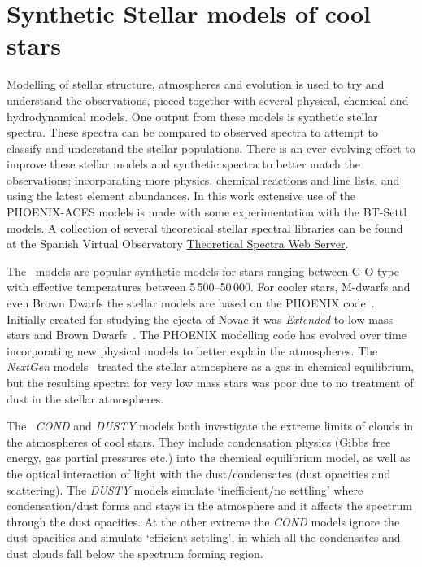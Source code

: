 

\section{Synthetic Stellar models of cool stars}
Modelling of stellar structure, atmospheres and evolution is used to try and understand the observations, pieced together with several physical, chemical and hydrodynamical models.
One output from these models is synthetic stellar spectra.
These spectra can be compared to observed spectra to attempt to classify and understand the stellar populations.
There is an ever evolving effort to improve these stellar models and synthetic spectra to better match the observations; incorporating more physics, chemical reactions and line lists, and using the latest element abundances.
In this work extensive use of the {PHOENIX-ACES} models is made with some experimentation with the {BT-Settl} models.
A collection of several theoretical stellar spectral libraries can be found at the Spanish Virtual Observatory \href{http://svo2.cab.inta-csic.es/theory/newov/index.php}{Theoretical Spectra Web Server}.

The~\citet{kurucz_model_1979} models are popular synthetic models for stars ranging between G-O type with effective temperatures between 5\,500--50\,000\K{}.
For cooler stars, M-dwarfs and even Brown Dwarfs the stellar models are based on the {PHOENIX} code~\citep[e.g.][]{hauschildt_parallel_1997}.
Initially created for studying the ejecta of Novae it was \emph{Extended} to low mass stars and Brown Dwarfs~\citep{allard_model_1995}.
The {PHOENIX} modelling code has evolved over time incorporating new physical models to better explain the atmospheres.
The \emph{NextGen} models~\citep{hauschildt_nextgen_1999} treated the stellar atmosphere as a gas in chemical equilibrium, but the resulting spectra for very low mass stars was poor due to no treatment of dust in the stellar atmospheres.

The~\citep{allard_limiting_2001} \emph{COND} and \emph{DUSTY} models both investigate the extreme limits of clouds in the atmospheres of cool stars.
They include condensation physics (Gibbs free energy, gas partial pressures etc.) into the chemical equilibrium model, as well as the optical interaction of light with the dust/condensates (dust opacities and scattering).
The \emph{DUSTY} models simulate `inefficient/no settling' where condensation/dust forms and stays in the atmosphere and it affects the spectrum through the dust opacities.
At the other extreme the \emph{COND} models ignore the dust opacities and simulate `efficient settling', in which all the condensates and dust clouds fall below the spectrum forming region.

